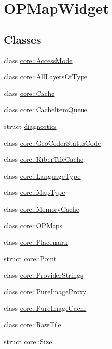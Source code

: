 \hypertarget{group___o_p_map_widget}{\section{\-O\-P\-Map\-Widget}
\label{group___o_p_map_widget}
}
\subsection*{\-Classes}
\begin{DoxyCompactItemize}
\item 
class \hyperlink{classcore_1_1_access_mode}{core\-::\-Access\-Mode}
\item 
class \hyperlink{classcore_1_1_all_layers_of_type}{core\-::\-All\-Layers\-Of\-Type}
\item 
class \hyperlink{classcore_1_1_cache}{core\-::\-Cache}
\item 
class \hyperlink{classcore_1_1_cache_item_queue}{core\-::\-Cache\-Item\-Queue}
\item 
struct \hyperlink{structdiagnostics}{diagnostics}
\item 
class \hyperlink{classcore_1_1_geo_coder_status_code}{core\-::\-Geo\-Coder\-Status\-Code}
\item 
class \hyperlink{classcore_1_1_kiber_tile_cache}{core\-::\-Kiber\-Tile\-Cache}
\item 
class \hyperlink{classcore_1_1_language_type}{core\-::\-Language\-Type}
\item 
class \hyperlink{classcore_1_1_map_type}{core\-::\-Map\-Type}
\item 
class \hyperlink{classcore_1_1_memory_cache}{core\-::\-Memory\-Cache}
\item 
class \hyperlink{classcore_1_1_o_p_maps}{core\-::\-O\-P\-Maps}
\item 
class \hyperlink{classcore_1_1_placemark}{core\-::\-Placemark}
\item 
struct \hyperlink{structcore_1_1_point}{core\-::\-Point}
\item 
class \hyperlink{classcore_1_1_provider_strings}{core\-::\-Provider\-Strings}
\item 
class \hyperlink{classcore_1_1_pure_image_proxy}{core\-::\-Pure\-Image\-Proxy}
\item 
class \hyperlink{classcore_1_1_pure_image_cache}{core\-::\-Pure\-Image\-Cache}
\item 
class \hyperlink{classcore_1_1_raw_tile}{core\-::\-Raw\-Tile}
\item 
struct \hyperlink{structcore_1_1_size}{core\-::\-Size}

\end{DoxyCompactItemize}

